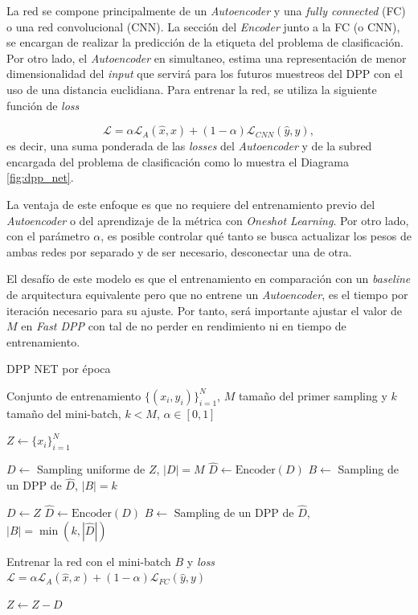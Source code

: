 \vspace{0.2cm}

La red se compone principalmente de un \textit{Autoencoder} y una \textit{fully connected} (FC) o una red convolucional (CNN). La sección del \textit{Encoder} junto a la FC (o CNN), se encargan de realizar la predicción de la etiqueta del problema de clasificación. Por otro lado, el \textit{Autoencoder} en simultaneo, estima una representación de menor dimensionalidad del \textit{input} que servirá para los futuros muestreos del DPP con el uso de una distancia euclidiana. Para entrenar la red, se utiliza la siguiente función de \textit{loss}

\[
\mathcal{L} = \alpha\mathcal{L}_A(\hat{x},x) + (1-\alpha)\mathcal{L}_{CNN}(\hat{y},y) , 
\] es decir, una suma ponderada de las \textit{losses} del \textit{Autoencoder} y de la subred encargada del problema de clasificación como lo muestra el Diagrama \ref{fig:dpp_net}.

\vspace{0.2cm}

La ventaja de este enfoque es que no requiere del entrenamiento previo del \textit{Autoencoder} o del aprendizaje de la métrica con \textit{Oneshot Learning}. Por otro lado, con el parámetro $\alpha$, es posible controlar qué tanto se busca actualizar los pesos de ambas redes por separado y de ser necesario, desconectar una de otra. 

\vspace{0.2cm}

El desafío de este modelo es que el entrenamiento en comparación con un \textit{baseline} de arquitectura equivalente pero que no entrene un \textit{Autoencoder}, es el tiempo por iteración necesario para su ajuste. Por tanto, será importante ajustar el valor de $M$ en \textit{Fast DPP} con tal de no perder en rendimiento ni en tiempo de entrenamiento. 

\begin{algorithm}
\caption{DPP NET por época}\label{alg:alg7}
\begin{algorithmic}
\Require Conjunto de entrenamiento $\{(x_i,y_i) \}_{i=1}^N$, $M$ tamaño del primer sampling y $k$ tamaño del mini-batch, $k < M$, $\alpha \in [0,1]$ 

\State $Z \gets \{x_i\}_{i=1}^N$


\State $D \gets$ Sampling uniforme de $Z$, $|D| = M$
\State $\hat{D} \gets \text{Encoder}(D)$
\State $B \gets$ Sampling de un DPP de $\hat{D}$, $|B| = k$  

\Else

\State $D \gets Z$
\State $\hat{D} \gets \text{Encoder}(D)$
\State $B \gets$ Sampling de un DPP de $\hat{D}$, $|B| = \min(k, |\hat{D}|)$ 

\EndIf

\State Entrenar la red con el mini-batch $B$ y \textit{loss} $\mathcal{L} = \alpha\mathcal{L}_A(\hat{x},x) + (1-\alpha)\mathcal{L}_{FC}(\hat{y},y) $ 

\State $Z \gets Z - D$

\EndWhile  
\end{algorithmic}
\end{algorithm}

